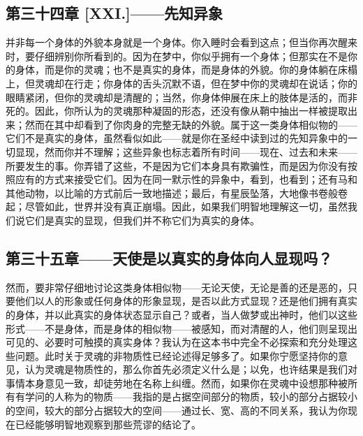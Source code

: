 
\subsection{第三十四章 [XXI.]——先知异象}

并非每一个身体的外貌本身就是一个身体。你入睡时会看到这点；但当你再次醒来时，要仔细辨别你所看到的。因为在梦中，你似乎拥有一个身体；但那实在不是你的身体，而是你的灵魂；也不是真实的身体，而是身体的外貌。你的身体躺在床榻上，但灵魂却在行走；你身体的舌头沉默不语，但在梦中你的灵魂却在说话；你的眼睛紧闭，但你的灵魂却是清醒的；当然，你身体伸展在床上的肢体是活的，而非死的。因此，你所认为的灵魂那种凝固的形态，还没有像从鞘中抽出一样被提取出来；然而在其中却看到了你肉身的完整无缺的外貌。属于这一类身体相似物的——它们不是真实的身体，虽然看似如此——就是你在圣经中读到过的先知异象中的一切显现，然而你并不理解；这些异象也标志着所有时间——现在、过去和未来——所要发生的事。你弄错了这些，不是因为它们本身具有欺骗性，而是因为你没有按照应有的方式来接受它们。因为在同一默示性的异象中，看到，也看到；还有马和其他动物，以比喻的方式前后一致地描述；最后，有星辰坠落，大地像书卷般卷起；尽管如此，世界并没有真正崩塌。因此，如果我们明智地理解这一切，虽然我们说它们是真实的显现，但我们并不称它们为真实的身体。\par


\subsection{第三十五章——天使是以真实的身体向人显现吗？}

然而，要非常仔细地讨论这类身体相似物——无论天使，无论是善的还是恶的，只要他们以人的形象或任何身体的形象显现，是否以此方式显现？还是他们拥有真实的身体，并以此真实的身体状态显示自己？或者，当人做梦或出神时，他们以这些形式——不是身体，而是身体的相似物——被感知，而对清醒的人，他们则呈现出可见的、必要时可触摸的真实身体？我认为在这本书中完全不必探索和充分处理这些问题。此时关于灵魂的非物质性已经论述得足够多了。如果你宁愿坚持你的意见，认为灵魂是物质性的，那么你首先必须定义什么是；以免，也许结果是我们对事情本身意见一致，却徒劳地在名称上纠缠。然而，如果你在灵魂中设想那种被所有有学问的人称为的物质——我指的是占据空间部分的物质，较小的部分占据较小的空间，较大的部分占据较大的空间——通过长、宽、高的不同关系，我认为你现在已经能够明智地观察到那些荒谬的结论了。\par

